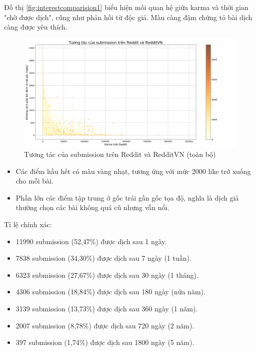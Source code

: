 \documentclass[10pt,a4paper]{article}
\begin{document}
Đồ thị \eqref{fig:interestcomparision1} biểu hiện mối quan hệ giữa karma và thời gian "chờ được dịch", cũng như phản hồi từ độc giả. Màu càng đậm chứng tỏ bài dịch càng được yêu thích.
\begin{figure}[!h]
    \centering
    \includegraphics[width=\textwidth]{img/InterestComparision.png}
    \caption{Tương tác của submission trên Reddit và RedditVN (toàn bộ)}
    \label{fig:interestcomparision1}
\end{figure}
\begin{itemize}
    \item Các điểm hầu hết có màu vàng nhạt, tương ứng với mức 2000 like trở xuống cho mỗi bài.
    \item Phần lớn các điểm tập trung ở gốc trái gần gốc tọa độ, nghĩa là dịch giả thường chọn các bài không quá cũ nhưng vẫn nổi.
\end{itemize}

Tỉ lệ chính xác:
\begin{itemize}
    \item 11990 submission (52,47\%) được dịch sau 1 ngày.
    \item 7838 submission (34,30\%) được dịch sau 7 ngày (1 tuần).
    \item 6323 submission (27,67\%) được dịch sau 30 ngày (1 tháng).
    \item 4306 submission (18,84\%) được dịch sau 180 ngày (nửa năm).
    \item 3139 submission (13,73\%) được dịch sau 360 ngày (1 năm).
    \item 2007 submission (8,78\%) được dịch sau 720 ngày (2 năm).
    \item 397 submission (1,74\%) được dịch sau 1800 ngày (5 năm).
\end{itemize}
\end{document}
